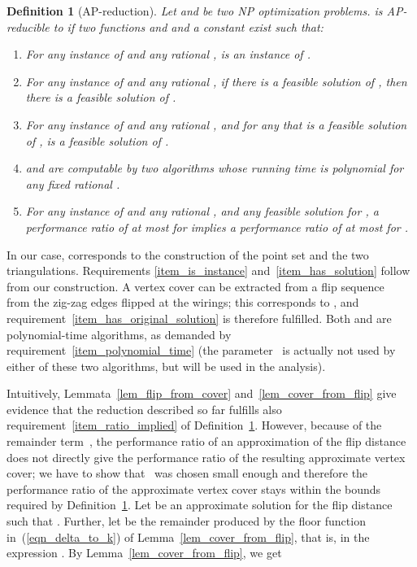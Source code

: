 \documentclass[11pt,a4paper]{article}
\newtheorem{definition}{Definition}
\begin{document}
\begin{definition}[AP-reduction]\label{def_ap_reduction}
Let  and  be two NP optimization problems.
 is \emph{AP-reducible} to  if two functions  and  and a constant  exist such that:
\begin{enumerate}
 \item\label{item_is_instance} For any instance  of  and any rational ,  is an instance of .
 \item\label{item_has_solution} For any instance  of  and any rational , if there is a feasible solution of , then there is a feasible solution of .
 \item\label{item_has_original_solution} For any instance  of  and any rational , and for any  that is a feasible solution of ,  is a feasible solution of .
 \item\label{item_polynomial_time}  and  are computable by two algorithms whose running time is polynomial for any fixed rational .
 \item\label{item_ratio_implied} For any instance  of  and any rational , and any feasible solution  for , a performance ratio of at most  for  implies a performance ratio of at most  for .
\end{enumerate}
\end{definition}
In our case,  corresponds to the construction of the point set and the two triangulations.
Requirements \ref{item_is_instance} and~\ref{item_has_solution} follow from our construction.
A vertex cover can be extracted from a flip sequence~ from the zig-zag edges flipped at the wirings;
this corresponds to , and requirement~\ref{item_has_original_solution} is therefore fulfilled.
Both  and  are polynomial-time algorithms, as demanded by requirement~\ref{item_polynomial_time} (the parameter~ is actually not used by either of these two algorithms, but will be used in the analysis).

Intuitively, Lemmata~\ref{lem_flip_from_cover} and~\ref{lem_cover_from_flip} give evidence that the reduction described so far fulfills also requirement~\ref{item_ratio_implied} of Definition~\ref{def_ap_reduction}.
However, because of the remainder term~, the performance ratio of an approximation of the flip distance does not directly give the performance ratio of the resulting approximate vertex cover;
we have to show that~ was chosen small enough and therefore the performance ratio of the approximate vertex cover stays within the bounds required by Definition~\ref{def_ap_reduction}.
Let  be an approximate solution for the flip distance such that .
Further, let  be the remainder produced by the floor function in~(\ref{eqn_delta_to_k}) of Lemma~\ref{lem_cover_from_flip}, that is, in the expression .
By Lemma~\ref{lem_cover_from_flip}, we get
\end{document}
